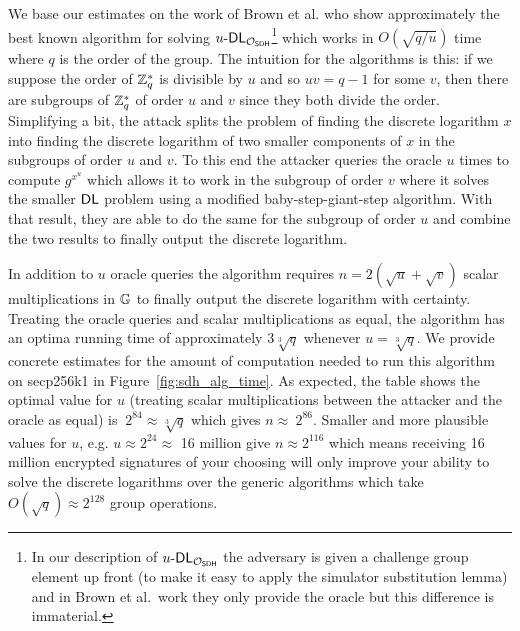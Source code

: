 We base our estimates on the work of Brown et al.\cite{SDHP} who show approximately the best known algorithm for solving $u\text{-}\textsf{DL}_{\mathcal{O}_{\textsf{SDH}}}$\footnote{In our description of $u\text{-}\textsf{DL}_{\mathcal{O}_{\textsf{SDH}}}$ the adversary is given a challenge group element up front (to make it easy to apply the simulator substitution lemma) and in Brown et al.\ work they only provide the oracle but this difference is immaterial.} which works in $O(\sqrt{q/u})$ time where $q$ is the order of the group.
The intuition for the algorithms is this: if we suppose the order of $\mathbb{Z}^*_q$ is divisible by $u$ and so $uv = q-1$ for some $v$, then there are subgroups of $\mathbb{Z}^*_q$ of order $u$ and $v$ since they both divide the order.
Simplifying a bit, the attack splits the problem of finding the discrete logarithm $x$ into finding the discrete logarithm of two smaller components of $x$ in the subgroups of order $u$ and $v$.
To this end the attacker queries the oracle $u$ times to compute $g^{x^u}$ which allows it to work in the subgroup of order $v$ where it solves the smaller $\textsf{DL}$ problem using a modified baby-step-giant-step algorithm.
With that result, they are able to do the same for the subgroup of order $u$ and combine the two results to finally output the discrete logarithm.

In addition to $u$ oracle queries the algorithm requires $n = 2(\sqrt{u} + \sqrt{v})$ scalar multiplications in $\mathbb{G}$ to finally output the discrete logarithm with certainty.
Treating the oracle queries and scalar multiplications as equal, the algorithm has an optima running time of approximately $3\sqrt[3]{q}$ whenever $u = \sqrt[3]{q}$.
We provide concrete estimates for the amount of computation needed to run this algorithm on secp256k1 in Figure~\ref{fig:sdh_alg_time}.
As expected, the table shows the optimal value for $u$ (treating scalar multiplications between the attacker and the oracle as equal) is $~2^{84} \approx \sqrt[3]{q}$ which gives $n \approx ~2^{86}$.
Smaller and more plausible values for $u$, e.g. $u \approx 2^{24} \approx$ 16 million give $n \approx 2^{116}$ which means receiving 16 million encrypted signatures of your choosing will only improve your ability to solve the discrete logarithms over the generic algorithms which take $O(\sqrt{q}) \approx 2^{128}$ group operations.

